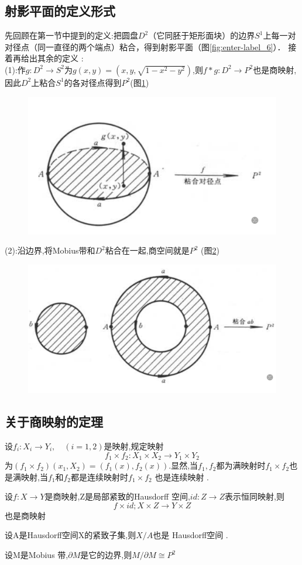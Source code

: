 \subsection*{射影平面的定义形式}
先回顾在第一节中提到的定义:把圆盘\(D^2\)（它同胚于矩形面块）的边界\(S^1\)上每一对对径点（同一直径的两个端点）粘合，得到射影平面（图\ref{fig:enter-label_6}）．
接着再给出其余的定义
:
\\
(1):作\(g: D^2 \rightarrow S^2\)为\(g(x,y) = (x,y,\sqrt{1-x^2-y^2}) \),则\(f*g : D^2 \rightarrow P^2\)也是商映射,因此\(D^2\)上粘合\(S^1\)的各对径点得到\(P^2\)(图\ref{fig:enter-label_8})
\begin{figure}[H]
    \centering
    \includegraphics[width=0.5\linewidth]{image_8.png}
    \caption{}
    \label{fig:enter-label_8}
\end{figure}
(2):沿边界,将Mobius带和\(D^2\)粘合在一起,商空间就是\(P^2\) (图\ref{fig:enter-label_9})
\begin{figure}[H]
    \centering
    \includegraphics[width=0.5\linewidth]{image_9.png}
    \caption{}
    \label{fig:enter-label_9}
\end{figure}
\subsection*{关于商映射的定理}
设\(f_i : X_i \rightarrow Y_i,\quad (i =1 ,2)\)是映射,规定映射
\[f_1 \times f_2 : X_1\times X_2 \rightarrow Y_1 \times Y_2\]
为\((f_1 \times f_2 ) (x_1,X_2) = (f_1(x) ,f_2(x))\).显然,当\(f_1 ,f_2\)都为满映射时\(f_1 \times f_2 \)也是满映射,当\(f_1\)和\(f_2\)都是连续映射时\(f_1 \times f_2\) 也是连续映射 .
\begin{theorem}
    设\(f: X \rightarrow Y \)是商映射,Z是局部紧致的Hausdorff 空间,\(id : Z \rightarrow Z \)表示恒同映射,则
    \[f \times id ; X \times Z \rightarrow Y \times Z\]
    也是商映射
\end{theorem}
\begin{theorem}
    设A是Hausdorff空间X的紧致子集,则\(X /A \)也是 Hausdorff空间 .
\end{theorem}
\begin{theorem}
    设M是Mobius 带,\(\partial M \)是它的边界,则\(M / \partial M \cong P^2\)
\end{theorem}
